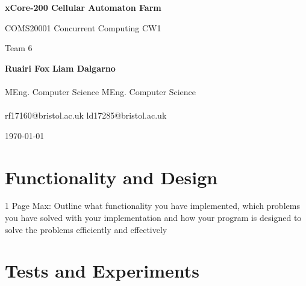 \documentclass{article}
\begin{document}
    \begin{titlepage}
        \begin{center}
            \vspace*{2cm}
            
            {\huge \textbf{xCore-200 Cellular Automaton Farm}}
            
            \vspace{0.5cm}
            
            {\Large COMS20001 Concurrent Computing CW1}
            
            \vspace{0.5cm}
            
            {\large Team 6}
            
            \vspace{1cm}
            
            \hspace*{1cm} {\Large \textbf{Ruairi Fox}} \hfill {\Large \textbf{Liam Dalgarno}} \hspace*{1cm} \\~\\[-0.5em]
            \hspace*{1cm} MEng. Computer Science \hfill MEng. Computer Science  \hspace*{1cm} \\~\\[-1em]
            \hspace*{1cm} rf17160@bristol.ac.uk  \hfill ld17285@bristol.ac.uk  \hspace*{1cm} 
            
            \vspace{1cm}
            
            {\large \today}
        \end{center}
    \end{titlepage}

    \section{Functionality and Design}
    1 Page Max: Outline what functionality you have implemented, which problems you have solved with your implementation and how your program is designed to solve the problems efficiently and effectively
    \pagebreak

    \section{Tests and Experiments}
    
\end{document}
